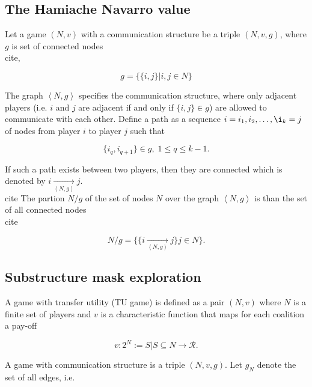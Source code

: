 \documentclass[twoside,twocolumn,9pt]{article}
\begin{document}
\subsection{The Hamiache Navarro value}

Let a game $(N, v)$ with a communication structure be a triple $(N, v, g)$, where $g$ is 
set of connected nodes\\cite{},

\begin{equation}
    g = \{ \{i, j \} | i, j \in N \}
\end{equation}

The graph $\left< N, g \right>$ specifies the communication structure, where only adjacent 
players (i.e. $i$ and $j$ are adjacent if and only if $\{ i, j \} \in g$) are allowed to 
communicate with each other. Define a path as a sequence $i = i_1, i_2, \dots, \i_k = j$
of nodes from player $i$ to player $j$ such that 

\begin{equation}
    \{i_q, i_{q+1} \} \in g, \; 1 \le q \le k - 1.
\end{equation}

If such a path exists between two players, then they are connected which is denoted by 
$i \underset{\left< N, g \right>}{\rightarrow} j$.\\cite{} The partion $N/g$ of the set of 
nodes $N$ over the graph $\left< N, g \right>$ is than the set of all connected nodes\\cite{}

\begin{equation}
    N/g = \{ \{ i \underset{\left<N, g \right>}{\rightarrow} j \} j \in N \}.
\end{equation}




\subsection{Substructure mask exploration}




A game with transfer utility (TU game) is defined as a pair $(N, v)$ where $N$ is a finite 
set of players and $v$ is a characteristic function that maps for each coalition a pay-off

\begin{equation}
    v: 2^N := {S | S \subseteq N} \rightarrow \mathcal{R}.
\end{equation}

A game with communication structure is a triple $(N, v, g)$.
Let $g_N$ denote the set of all edges, i.e. 
\end{document}

